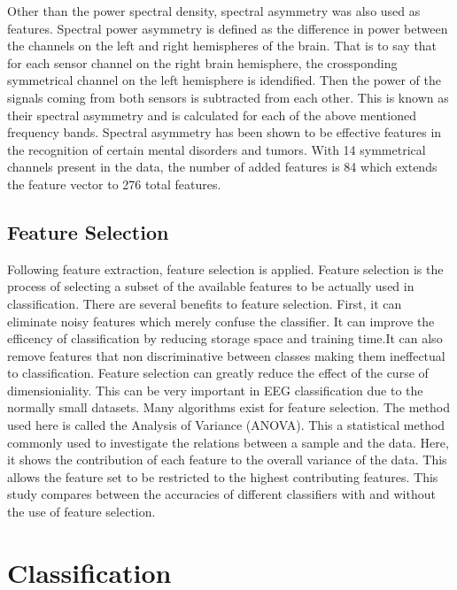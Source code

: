 \documentclass[12pt, a4paper, fleqn]{memoir}%
\begin{document}
Other than the power spectral density, spectral asymmetry was also used as features. Spectral power asymmetry is defined as the difference in power between the channels on the left and right hemispheres of the brain. That is to say that for each sensor channel on the right brain hemisphere, the crossponding symmetrical channel on the left hemisphere is idendified. Then the power of the signals coming from both sensors is subtracted from each other. This is known as their spectral asymmetry and is calculated for each of the above mentioned frequency bands. Spectral asymmetry has been shown to be effective features in the recognition of certain mental disorders and tumors. With 14 symmetrical channels present in the data, the number of added features is 84 which extends the feature vector to 276 total features.

\section{Feature Selection}
\label{sec:FeatureSelection}
Following feature extraction, feature selection is applied. Feature selection is the process of selecting a subset of the available features to be actually used in classification. There are several benefits to feature selection. First, it can eliminate noisy features which merely confuse the classifier. It can improve the efficency of classification by reducing storage space and training time.It can also remove features that non discriminative between classes making them ineffectual to classification. Feature selection can greatly reduce the effect of the curse of dimensioniality. This can be very important in EEG classification due to the normally small datasets. Many algorithms exist for feature selection. The method used here is called the Analysis of Variance (ANOVA). This a statistical method commonly used to investigate the relations between a sample and the data. Here, it shows the contribution of each feature to the overall variance of the data. This allows the feature set to be restricted to the highest contributing features. This study compares between the accuracies of different classifiers with and without the use of feature selection\cite{guyon2003introduction}.
\chapter{Classification}
\label{chap:Classification}
\end{document}
